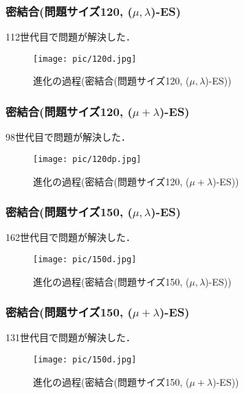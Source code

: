 \documentclass[a4j]{jarticle}
\begin{document}
\clearpage
\subsubsection*{密結合(問題サイズ120, ($\mu , \lambda$)-ES)}
112世代目で問題が解決した．
\begin{figure}[htb]
 \begin{center}
  \texttt{[image: pic/120d.jpg]}
  \caption{進化の過程(密結合(問題サイズ120, ($\mu , \lambda$)-ES))}
  \label{120d}
 \end{center}
\end{figure}

\subsubsection*{密結合(問題サイズ120, ($\mu + \lambda$)-ES)}
98世代目で問題が解決した．
\begin{figure}[htb]
 \begin{center}
  \texttt{[image: pic/120dp.jpg]}
  \caption{進化の過程(密結合(問題サイズ120, ($\mu + \lambda$)-ES))}
  \label{120dp}
 \end{center}
\end{figure}

\clearpage
\subsubsection*{密結合(問題サイズ150, ($\mu , \lambda$)-ES)}
162世代目で問題が解決した．
\begin{figure}[htb]
 \begin{center}
  \texttt{[image: pic/150d.jpg]}
  \caption{進化の過程(密結合(問題サイズ150, ($\mu , \lambda$)-ES))}
  \label{150d}
 \end{center}
\end{figure}

\subsubsection*{密結合(問題サイズ150, ($\mu + \lambda$)-ES)}
131世代目で問題が解決した．
\begin{figure}[htb]
 \begin{center}
  \texttt{[image: pic/150d.jpg]}
  \caption{進化の過程(密結合(問題サイズ150, ($\mu + \lambda$)-ES))}
  \label{150dp}
 \end{center}
\end{figure}
\end{document}
